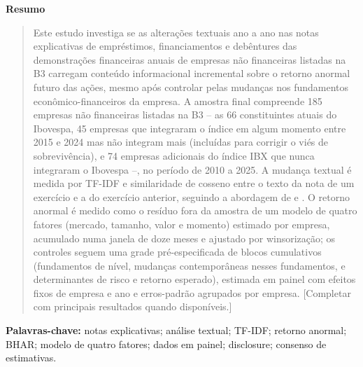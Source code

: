 \documentclass[a4paper,12pt]{report}
\renewenvironment{abstract}{
    \begin{center}
        \textbf{\abstractname}
    \end{center}
    \begin{quote}
}{\end{quote}}
\begin{document}
\renewcommand{\abstractname}{Resumo}
\begin{abstract}
    Este estudo investiga se as alterações textuais ano a ano nas notas explicativas de empréstimos, financiamentos e debêntures das demonstrações financeiras anuais de empresas não financeiras listadas na B3 carregam conteúdo informacional incremental sobre o retorno anormal futuro das ações, mesmo após controlar pelas mudanças nos fundamentos econômico-financeiros da empresa. A amostra final compreende 185 empresas não financeiras listadas na B3 -- as 66 constituintes atuais do Ibovespa, 45 empresas que integraram o índice em algum momento entre 2015 e 2024 mas não integram mais (incluídas para corrigir o viés de sobrevivência), e 74 empresas adicionais do índice IBX que nunca integraram o Ibovespa --, no período de 2010 a 2025. A mudança textual é medida por TF-IDF e similaridade de cosseno entre o texto da nota de um exercício e a do exercício anterior, seguindo a abordagem de  e . O retorno anormal é medido como o resíduo fora da amostra de um modelo de quatro fatores (mercado, tamanho, valor e momento) estimado por empresa, acumulado numa janela de doze meses e ajustado por winsorização; os controles seguem uma grade pré-especificada de blocos cumulativos (fundamentos de nível, mudanças contemporâneas nesses fundamentos, e determinantes de risco e retorno esperado), estimada em painel com efeitos fixos de empresa e ano e erros-padrão agrupados por empresa. [Completar com principais resultados quando disponíveis.]
\end{abstract}

\noindent
\textbf{Palavras-chave:} notas explicativas; análise textual; TF-IDF; retorno anormal; BHAR; modelo de quatro fatores; dados em painel; disclosure; consenso de estimativas.
\thispagestyle{empty}
\newpage
\end{document}
